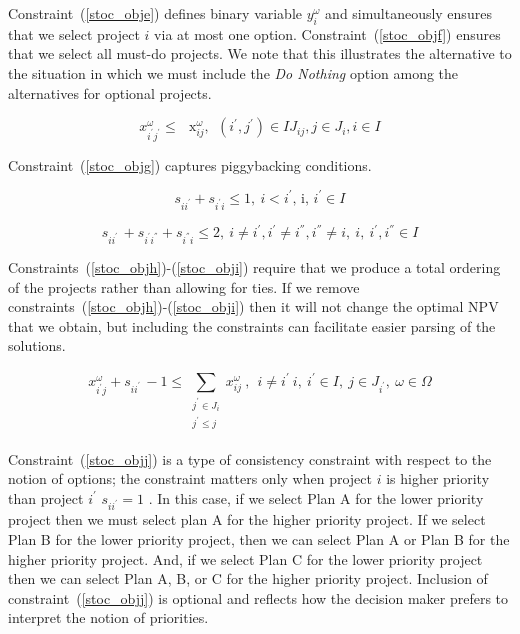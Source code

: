 Constraint~(\ref{stoc_obje}) defines binary variable  $y_{i}^{ \omega }$  and simultaneously ensures that we select project  $i$  via at most one option. Constraint~(\ref{stoc_objf}) ensures that we select all must-do projects. We note that this illustrates the alternative to the situation in which we must include the {\it Do Nothing}  option among the alternatives for optional projects.\par

\begin{equation}\label{stoc_objg}
x_{i^{'}j^{'}}^{ \omega }  \leq \text{~ x}_{ij}^{ \omega },~~ \left( i^{'},j^{'} \right)  \in IJ_{ij} , j \in J_{i},i \in I
\end{equation}

Constraint~(\ref{stoc_objg}) captures piggybacking conditions.\par

\begin{equation}\label{stoc_objh}
s_{ii^{'}}+s_{i^{'}i} \leq 1,~ i<i^{'}\text{, i, }i^{'} \in I
\end{equation}

\begin{equation}\label{stoc_obji}
s_{ii^{'}~}+s_{i^{'}i^{''}}+s_{i^{''}i} \leq 2,~ i \neq i^{'},i^{'} \neq  i^{''},i^{''} \neq i,~i,~i^{'},i^{''} \in I
\end{equation}

Constraints~(\ref{stoc_objh})-(\ref{stoc_obji}) require that we produce a total ordering of the
projects rather than allowing for ties. If we remove constraints~(\ref{stoc_objh})-(\ref{stoc_obji})
then it will not change the optimal NPV that we obtain, but including the constraints can facilitate
easier parsing of the solutions.\par

\begin{equation}\label{stoc_objj}
x_{i^{'}j}^{ \omega }+s_{ii^{'}~}-1 \leq  \sum _{\begin{array}{c}
	j^{'} \in J_{i}\\
	j^{'} \leq j~\\
	\end{array}}^{}x_{ij}^{ \omega }~,~~i \neq i^{'}~i,~i^{'} \in I,~j \in J_{i^{'}},~ \omega  \in  \Omega
\end{equation}


Constraint~(\ref{stoc_objj}) is a type of consistency constraint with respect to the notion of
options; the constraint matters only when project  $i$  is higher priority than project
$i^{'}$ $s_{ii^{'}}=1$ . In this case, if we select Plan A for the lower priority project
then we must select plan A for the higher priority project. If we select Plan B for the lower
priority project, then we can select Plan A or Plan B for the higher priority project. And,
if we select Plan C for the lower priority project then we can select Plan A, B, or C for the
higher priority project. Inclusion of constraint~(\ref{stoc_objj}) is optional and reflects
how the decision maker prefers to interpret the notion of priorities.

